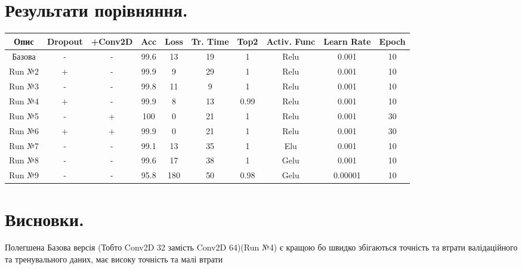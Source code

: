 \documentclass{article}
\begin{document}
    \section{Результати порівняння.}
    \begin{table}[h!]
        \begin{tabular}{| c | c | c | c | c | c | c | c | c | c |}
            \hline
            Опис & Dropout & +Conv2D & Acc & Loss & Tr. Time & Top2 & Activ. Func & Learn Rate & Epoch \\
            \hline
            Базова & - & - & 99.6 & 13 & 19 & 1 & Relu & 0.001 & 10 \\
            \hline
            Run №2 & + & - & 99.9 & 9 & 29 & 1 & Relu & 0.001 & 10 \\
            \hline
            Run №3 & - & - & 99.8 & 11 & 9 & 1 & Relu & 0.001 & 10 \\
            \hline
            Run №4 & + & - & 99.9 & 8 & 13 & 0.99 & Relu & 0.001 & 10 \\
            \hline
            Run №5 & - & + & 100 & 0 & 21 & 1 & Relu & 0.001 & 30 \\
            \hline
            Run №6 & + & + & 99.9 & 0 & 21 & 1 & Relu & 0.001 & 30 \\
            \hline
            Run №7 & - & - & 99.1 & 13 & 35 & 1 & Elu & 0.001 & 10 \\
            \hline
            Run №8 & - & - & 99.6 & 17 & 38 & 1 & Gelu & 0.001 & 10 \\
            \hline
            Run №9 & - & - & 95.8 & 180 & 50 & 0.98 & Gelu & 0.00001 & 10 \\
            \hline
        \end{tabular}
    \end{table}

    \section{Висновки.}
    Полегшена Базова версія (Тобто Conv2D 32 замість Conv2D 64)(Run №4) є кращою бо швидко збігаються точність та втрати валідаційного та тренувального даних, має високу точність та малі втрати
\end{document}
